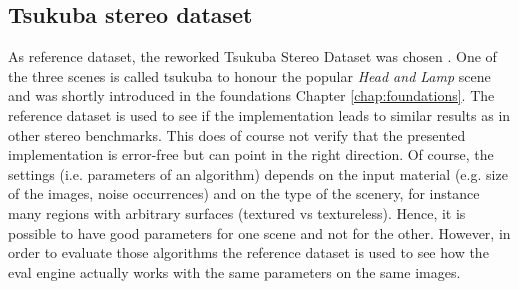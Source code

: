 \subsection*{Tsukuba stereo dataset}

As reference dataset, the reworked Tsukuba Stereo Dataset was chosen \citep{martull2012realistic}.
One of the three scenes is called tsukuba to honour the popular \textit{Head and Lamp} scene and was shortly introduced in the foundations Chapter \ref{chap:foundations}.
The reference dataset is used to see if the implementation leads to similar results as in other stereo benchmarks.
This does of course not verify that the presented implementation is error-free but can point in the right direction.
Of course, the settings (i.e. parameters of an algorithm) depends on the input material (e.g. size of the images, noise occurrences) and on the type of the scenery, for instance many regions with arbitrary surfaces (textured vs textureless).
Hence, it is possible to have good parameters for one scene and not for the other.
However, in order to evaluate those algorithms the reference dataset is used to see how the eval engine actually works with the same parameters on the same images.

